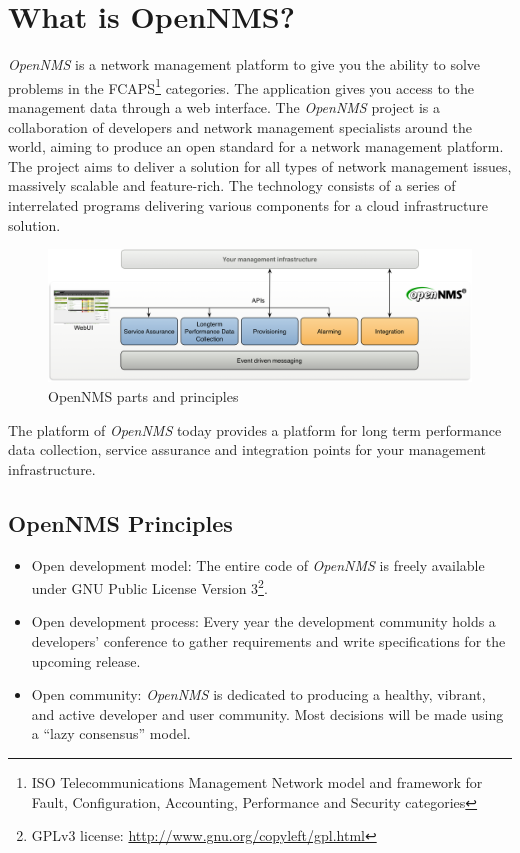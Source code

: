 \section{What is OpenNMS?}
\emph{OpenNMS} is a network management platform to give you the ability to solve problems in the FCAPS\footnote{ISO Telecommunications Management Network model and framework for Fault, Configuration, Accounting, Performance and Security categories} categories. The application gives you access to the management data through a web interface. The \emph{OpenNMS} project is a collaboration of developers and network management specialists around the world, aiming to produce an open standard for a network management platform. The project aims to deliver a solution for all types of network management issues, massively scalable and feature-rich. The technology consists of a series of interrelated programs delivering various components for a cloud infrastructure solution.

\begin{figure}[h]
	\centering
	\includegraphics[width=1.0\textwidth]{images/opennms-principles.png}
	\caption{OpenNMS parts and principles}
	\label{fig:opennms-principles}
\end{figure}

The platform of \emph{OpenNMS} today provides a platform for long term performance data collection, service assurance and integration points for your management infrastructure.

\subsection{OpenNMS Principles}
\begin{itemize}
  \item Open development model: The entire code of \emph{OpenNMS} is freely available under GNU Public License Version 3\footnote{GPLv3 license: \url{http://www.gnu.org/copyleft/gpl.html}}.
  \item Open development process: Every year the development community holds a developers' conference to gather requirements and write specifications for the upcoming release.
  \item Open community: \emph{OpenNMS} is dedicated to producing a healthy, vibrant, and active developer and user community. Most decisions will be made using a ``lazy consensus'' model.
\end{itemize}

